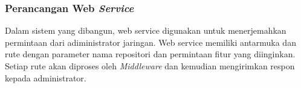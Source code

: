         
        \subsubsection{Perancangan Web \textit{Service}}
        	Dalam sistem yang dibangun, web service digunakan untuk menerjemahkan permintaan dari adiministrator jaringan. Web service memiliki antarmuka dan rute dengan parameter nama repositori dan permintaan fitur yang diinginkan. Setiap rute akan diproses oleh \textit{Middleware} dan kemudian mengirimkan respon kepada administrator.
         	
        
       
            
        